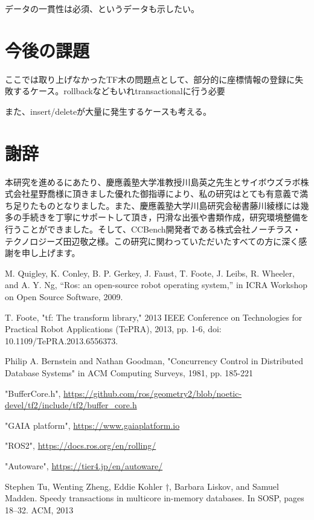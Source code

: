 \documentclass[a4paper]{jreport}	%
\begin{document}
データの一貫性は必須、というデータも示したい。

\chapter{今後の課題}
ここでは取り上げなかったTF木の問題点として、部分的に座標情報の登録に失敗するケース。rollbackなどもいれtransactionalに行う必要

また、insert/deleteが大量に発生するケースも考える。


\chapter*{謝辞}

本研究を進めるにあたり、慶應義塾大学准教授川島英之先生とサイボウズラボ株式会社星野喬様に頂きました優れた御指導により、私の研究はとても有意義で満ち足りたものとなりました。また、慶應義塾大学川島研究会秘書藤川綾様には幾多の手続きを丁寧にサポートして頂き，円滑な出張や書類作成，研究環境整備を行うことができました。そして、CCBench開発者である株式会社ノーチラス・テクノロジーズ田辺敬之様。この研究に関わっていただいたすべての方に深く感謝を申し上げます。

\newpage
{}
\renewcommand{\bibname}{参考文献}



%
%

	
\begin{thebibliography}{99}


 M. Quigley, K. Conley, B. P. Gerkey, J. Faust, T. Foote, J. Leibs, R. Wheeler, and A. Y. Ng, “Ros: an open-source robot operating system,” in ICRA Workshop on Open Source Software, 2009.

 T. Foote, "tf: The transform library," 2013 IEEE Conference on Technologies for Practical Robot Applications (TePRA), 2013, pp. 1-6, doi: 10.1109/TePRA.2013.6556373.

 Philip A. Bernstein and Nathan Goodman, "Concurrency Control in Distributed Database Systems" in ACM Computing Surveys, 1981, pp. 185-221

 "BufferCore.h", \url{https://github.com/ros/geometry2/blob/noetic-devel/tf2/include/tf2/buffer_core.h}

 "GAIA platform", \url{https://www.gaiaplatform.io}

 "ROS2", \url{https://docs.ros.org/en/rolling/}

 "Autoware", \url{https://tier4.jp/en/autoware/}

 Stephen Tu, Wenting Zheng, Eddie Kohler †, Barbara Liskov,
and Samuel Madden. Speedy transactions in multicore in-memory
databases. In SOSP, pages 18–32. ACM, 2013

\end{thebibliography}
\end{document}
